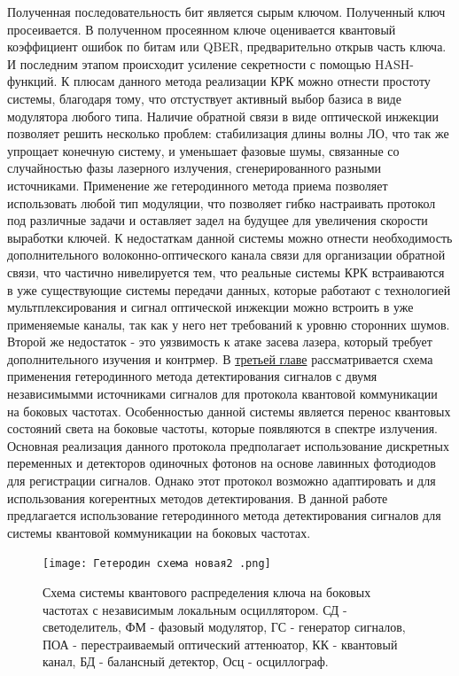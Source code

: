 Полученная последовательность бит является сырым ключом. Полученный ключ просеивается. В полученном просеянном ключе оценивается квантовый коэффициент ошибок по битам или QBER, предварительно открыв часть ключа. И последним этапом происходит усиление секретности  с помощью HASH-функций.
\newline К плюсам данного метода реализации КРК можно отнести простоту системы, благодаря тому, что отстуствует активный выбор базиса в виде модулятора любого типа. Наличие обратной связи в виде оптической инжекции позволяет решить несколько проблем: стабилизация длины волны ЛО, что так же упрощает конечную систему, и уменьшает фазовые шумы, связанные со случайностью фазы лазерного излучения, сгенерированного разными источниками. Применение же гетеродинного метода приема позволяет использовать любой тип модуляции, что позволяет гибко настраивать протокол под различные задачи и оставляет задел на будущее для увеличения скорости выработки ключей.
\newline К недостаткам данной системы можно отнести необходимость дополнительного волоконно-оптического канала связи для организации обратной связи, что частично нивелируется тем, что реальные системы КРК встраиваются в уже существующие системы передачи данных, которые работают с технологией мультплексирования и сигнал оптической инжекции можно встроить в уже применяемые каналы, так как у него нет требований к уровню сторонних шумов. Второй же недостаток - это уязвимость к атаке засева лазера, который требует дополнительного изучения и контрмер. 
\newpage В \underline{третьей главе} рассматривается схема применения гетеродинного метода детектирования \cite{brunner2017,delange1968,kuri2003} сигналов с двумя независимымми источниками сигналов \cite{hajomer2024,shao2022} для протокола квантовой коммуникации на боковых частотах. Особенностью данной системы является перенос квантовых состояний света на боковые частоты, которые появляются в спектре излучения. Основная реализация данного протокола предполагает использование дискретных переменных и детекторов одиночных фотонов на основе лавинных фотодиодов для регистрации сигналов. Однако этот протокол возможно адаптировать и для использования когерентных методов детектирования\cite{samsonov2021,fadeev2024}. 
\newline В данной работе предлагается использование гетеродинного метода детектирования сигналов для системы квантовой коммуникации на боковых частотах.
\begin{figure}
    \centering
    \texttt{[image: Гетеродин схема новая2 .png]}
    \caption{Схема системы квантового распределения ключа на боковых частотах с независимым локальным осциллятором. СД - светоделитель, ФМ - фазовый модулятор, ГС - генератор сигналов, ПОА - перестраиваемый оптический аттенюатор, КК - квантовый канал, БД - балансный детектор, Осц - осциллограф.}
    \label{fig:het true scheme}
\end{figure}
